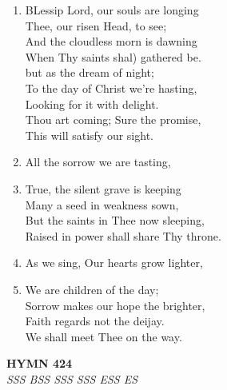 \documentclass[11pt,a4paper]{article}
\begin{document}
\begin{enumerate}
    \item BLessip Lord, our souls are longing \\
        Thee, our risen Head, to see; \\
        And the cloudless morn is dawning \\
        When Thy saints shal) gathered be. \\
        but as the dream of night; \\
        To the day of Christ we're hasting, \\
        Looking for it with delight. \\
        Thou art coming; Sure the promise, \\
        This will satisfy our sight.

    \item All the sorrow we are tasting,

    \item True, the silent grave is keeping \\
        Many a seed in weakness sown, \\
        But the saints in Thee now sleeping, \\
        Raised in power shall share Thy throne.

    \item As we sing, Our hearts grow lighter,

    \item We are children of the day; \\
        Sorrow makes our hope the brighter, \\
        Faith regards not the deijay. \\
        We shall meet Thee on the way.

\end{enumerate}

\newpage
\begin{center}
    {\Large \textbf{HYMN 424}}
    \\
    \textit{SSS BSS SSS SSS ESS ES}
\end{center}
\vspace{1em}
\end{document}

